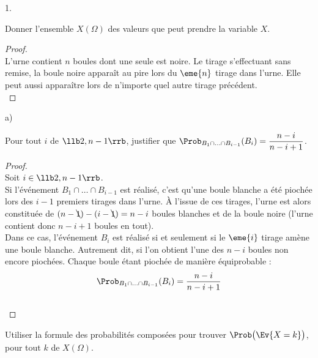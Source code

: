 \documentclass[11pt]{article}%
\begin{document}
\begin{noliste}{1.}
  \setlength{\itemsep}{4mm}
\item Donner l'ensemble $X(\Omega)$ des valeurs que peut prendre la
  variable $X$.

  \begin{proof}~\\%
    L'urne contient $n$ boules dont une seule est noire. Le tirage
    s'effectuant sans remise, la boule noire apparaît au pire lors du
    $\eme{n}$ tirage dans l'urne. Elle peut aussi apparaître lors de
    n'importe quel autre tirage précédent. %
    ~\\[-1cm]
  \end{proof}

\item 
  \begin{noliste}{a)}
    \setlength{\itemsep}{2mm}
  \item Pour tout $i$ de $\llb 2, n-1 \rrb$, justifier que $\Prob_{B_1
      \cap \ldots \cap B_{i-1}}(B_i) = \dfrac{n-i}{n-i+1}$.

    \begin{proof}~\\%
      Soit $i \in \llb 2, n-1 \rrb$.\\[.2cm]
      Si l'événement $B_1 \cap \ldots \cap B_{i-1}$ est réalisé, c'est
      qu'une boule blanche a été piochée lors des $i-1$ premiers
      tirages dans l'urne. À l'issue de ces tirages, l'urne est alors
      constituée de $(n - \bcancel{1}) - (i - \bcancel{1}) = n-i$
      boules blanches et de la boule noire (l'urne contient
      donc $n-i + 1$ boules en tout).\\[.1cm]
      Dans ce cas, l'événement $B_i$ est réalisé si et seulement si le
      $\eme{i}$ tirage amène une boule blanche. Autrement dit, si l'on
      obtient l'une des $n-i$ boules non encore piochées. Chaque boule
      étant piochée de manière équiprobable :
      \[
      \Prob_{B_1 \cap \ldots \cap B_{i-1}}(B_i) = \dfrac{n-i}{n-i+1}
      \]
      ~\\[-1cm]
    \end{proof}


    \newpage


  \item Utiliser la formule des probabilités composées pour trouver
    $\Prob\big( \Ev{X = k} \big)$, pour tout $k$ de $X(\Omega)$.


\end{noliste}
\end{noliste}
\end{document}
